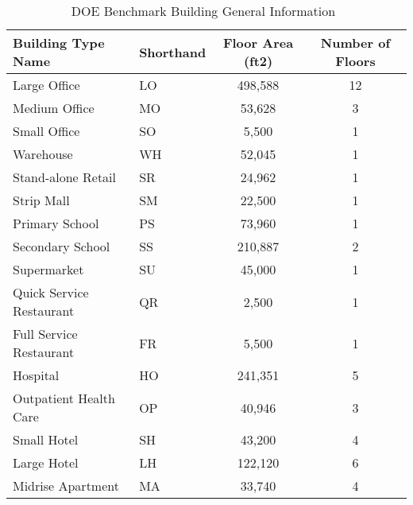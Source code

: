 \documentclass[hidelinks,12pt]{article}
\begin{document}
\begin{table}[h!]
  \centering
  \begin{tabular}{l|l|c|c}
    \hline
Building Type Name&Shorthand&  Floor Area (ft2)    & Number of Floors\\
    \hline
Large Office	         &LO&  498,588	      & 12\\
Medium Office	         &MO&  53,628	      & 3\\
Small Office	         &SO&  5,500	      & 1\\
Warehouse	         &WH&  52,045	      & 1\\
Stand-alone Retail       &SR&  24,962	      & 1\\
Strip Mall	         &SM&  22,500	      & 1\\
Primary School	         &PS&  73,960	      & 1\\
Secondary School         &SS&  210,887	      & 2\\
Supermarket	         &SU&  45,000	      & 1\\
Quick Service Restaurant &QR&  2,500          & 1\\
Full Service Restaurant  &FR&  5,500          & 1\\
Hospital	         &HO&  241,351	      & 5\\
Outpatient Health Care   &OP&  40,946	      & 3\\
Small Hotel	         &SH&  43,200	      & 4\\
Large Hotel	         &LH&  122,120	      & 6\\
Midrise Apartment        &MA&  33,740	      & 4\\
    \hline
\end{tabular}
\caption{DOE Benchmark Building General Information~\cite{DOE2015}}
\label{tab:doeModel}
\end{table}

\begin{comment}
The default setting of the benchmark models are stand-alone, but the
building in a community setting are imposed to influences from
surrounding buildings and the ``stand-alone'' assumption is not
realistic. To account for this issue, the model used in this study is
assumed to be within an urban context, thus the presence of
surrounding building should be reflected in the reference building
models. The general assumption used in this study is a 20ft exterior
shading on each side of each building.
\end{comment}
\end{document}
